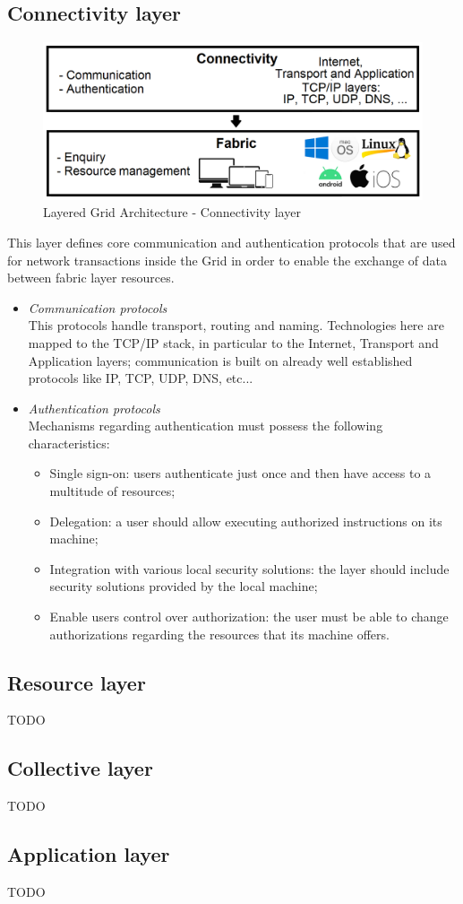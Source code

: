 \subsection{Connectivity layer}
\begin{figure}[!ht]
    \centering
    \includegraphics[scale=0.35]{document/chapters/chapter_2/images/connectivity_layer.png}
    \caption{Layered Grid Architecture - Connectivity layer}
    \label{fig:connectivity_layer}
\end{figure}
\vspace{5mm}

\noindent This layer defines core communication and authentication protocols that are used for network transactions inside the Grid in order to enable the exchange of data between fabric layer resources.
\begin{itemize}
    \item \textit{Communication protocols}\\
    This protocols handle transport, routing and naming. Technologies here are mapped to the TCP/IP stack, in particular to the Internet, Transport and Application layers; communication is built on already well established protocols like IP, TCP, UDP, DNS, etc... 
    \item \textit{Authentication protocols}\\
    Mechanisms regarding authentication must possess the following characteristics:
    \begin{itemize}
        \item Single sign-on: users authenticate just once and then have access to a multitude of resources;
        \item Delegation: a user should allow executing authorized instructions on its machine; 
        \item Integration with various local security solutions: the layer should include security solutions provided by the local machine;
        \item Enable users control over authorization: the user must be able to change authorizations regarding the resources that its machine offers.
    \end{itemize}
\end{itemize}

\subsection{Resource layer}
TODO

\subsection{Collective layer}
TODO

\subsection{Application layer}
TODO
